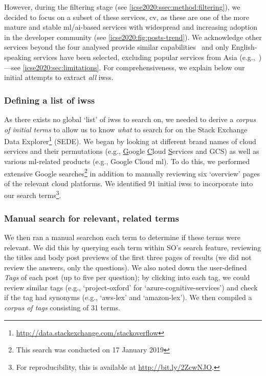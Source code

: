 However, during the filtering stage (see \cref{icse2020:ssec:method:filtering}), we decided to focus on a subset of these services, \gls{cv}, as these are one of the more mature and stable \gls{ml}/\gls{ai}-based services with widespread and increasing adoption in the developer community (see \cref{icse2020:fig:posts-trend}). We acknowledge other services beyond the four analysed provide similar capabilities~ and only English-speaking services have been selected, excluding popular services from Asia (e.g.,~)---see \cref{icse2020:sec:limitations}. For comprehensiveness, we explain below our initial attempts to extract \textit{all} \glspl{iws}. %

\subsubsection{Defining a list of \glspl{iws}}
As there exists no global `list' of \glspl{iws} to search on, we needed to derive a \textit{corpus of initial terms} to allow us to know \textit{what} to search for on the Stack Exchange Data Explorer\footnote{\url{http://data.stackexchange.com/stackoverflow}} (SEDE). We began by looking at different brand names of cloud services and their permutations (e.g., \uline{G}oogle \uline{C}loud \uline{S}ervices and GCS) as well as various \gls{ml}-related products (e.g., Google Cloud \gls{ml}). To do this, we performed extensive Google searches\footnote{This search was conducted on 17 January 2019}\def\footnotesearchdate{2} in addition to manually reviewing six `overview' pages of the relevant cloud platforms. We identified 91 initial \glspl{iws} to incorporate into our search terms\footnote{For reproducibility, this is available at \url{http://bit.ly/2ZcwNJO}.}.\def\footnotereproducability{3}

\subsubsection{Manual search for relevant, related terms}
We then ran a manual search\footnotemark[\footnotesearchdate{}] %
on each term to determine if these terms were relevant. We did this by querying each term within SO's search feature, reviewing the titles and body post previews of the first three pages of results (we did not review the answers, only the questions). We also noted down the user-defined \textit{Tags} of each post (up to five per question); by clicking into each tag, we could review similar tags (e.g., `project-oxford' for `azure-cognitive-services') and check if the tag had synonyms (e.g., `aws-lex' and `amazon-lex'). We then compiled a \textit{corpus of tags} consisting of 31 terms.

